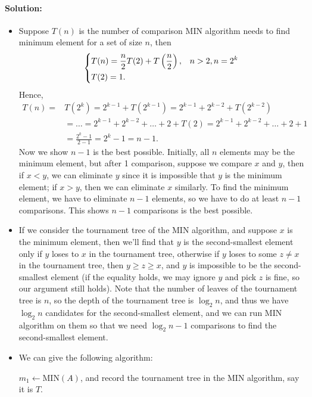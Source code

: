\documentclass[a4paper,12pt]{article}
\begin{document}
\paragraph{Solution:} 
\begin{itemize}
	\item [(a)] Suppose \(T(n)\) is the number of comparison MIN algorithm needs to find minimum element for a set of size \(n\), then 
	\[
		\begin{dcases}
			T(n) = \frac{n}{2} T(2) + T\left( \frac{n}{2} \right), &n > 2, n = 2^k \\
			T(2) = 1. 
		\end{dcases}
	\]
	Hence,
	\begin{align*}
		T(n) =& T\left( 2^k \right) = 2^{k-1} + T\left( 2^{k-1} \right) = 2^{k-1} + 2^{k-2} + T\left( 2^{k-2} \right) \\
		&= \dots = 2^{k-1} + 2^{k-2} + \dots + 2 + T(2) = 2^{k-1} + 2^{k-2} + \dots + 2 + 1 \\
		&= \frac{2^k - 1}{2 - 1} = 2^k - 1 = n - 1.  
	\end{align*}
	Now we show \(n - 1\) is the best possible. Initially, all \(n\) elements may be the minimum element, but after 1 comparison, suppose we compare \(x\) and \(y\), then if \(x < y\), we can eliminate \(y\) since it is impossible that \(y\) is the minimum element; if \(x > y\), then we can eliminate \(x\) similarly. To find the minimum element, we have to eliminate \(n-1\) elements, so we have to do at least \(n - 1\) comparisons. This shows \(n - 1\) comparisons is the best possible.           
	\item [(b)] If we consider the tournament tree of the MIN algorithm, and suppose \(x\) is the minimum element, then we'll find that \(y\) is the second-smallest element only if \(y\) loses to \(x\) in the tournament tree, otherwise if \(y\) loses to some \(z \neq x\) in the tournament tree, then \(y \ge z \ge x\), and \(y\) is impossible to be the second-smallest element (if the equality holds, we may ignore \(y\) and pick \(z\) is fine, so our argument still holds). Note that the number of leaves of the tournament tree is \(n\), so the depth of the tournament tree is \(\log _2 n\), and thus we have \(\log _2 n\) candidates for the second-smallest element, and we can run MIN algorithm on them so that we need \(\log _2 n - 1\) comparisons to find the second-smallest element.           
	\item [(c)] We can give the following algorithm: \\
	\begin{algorithm}[H]
		\medskip
		\medskip
		\(m_1 \gets \text{MIN}(A)\), and record the tournament tree in the MIN algorithm, say it is \(T\). 
		

\end{algorithm}
\end{itemize}
\end{document}
